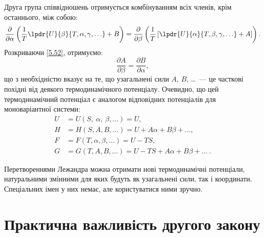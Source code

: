 Друга група співвідношень отримується комбінуванням всіх членів, крім останнього, між собою:
\begin{equation}\label{5.52}
	\dfrac{\partial}{\partial\alpha}\left(\dfrac{1}{T}\lpdr{U}{\beta}{T,\alpha,\gamma,
		\ldots}+B\right)=\dfrac{\partial}{\partial\beta}\left(\dfrac{1}{T}\left[\lpdr{U}{\alpha}{T,\beta,
			\gamma, \ldots}+A\right]\right).
\end{equation}
Розкриваючи \eqref{5.52}, отримуємо:
\begin{equation}\label{5.53}
	\dfrac{\partial A}{\partial \beta}=\dfrac{\partial B}{\partial \alpha},
\end{equation}
що з необхідністю вказує на те, що узагальнені сили $A$, $B$, \ldots\ --- це часткові похідні від деякого термодинамічного потенціалу. Очевидно, що цей термодинамічний потенціал є аналогом відповідних потенціалів для моноваріантної системи:
\begin{align}
	U & = U\left(S,\ \alpha,\ \beta, \ldots\right)=U, \label{5.54}              \\
	H & = H\left(S,A,B,\ldots\right)=U+A\alpha+B\beta+\ldots, \label{5.55}      \\
	F & = F\left(T,\alpha,\beta,\ldots\right)=U-TS, \label{5.56}                \\
	G & = G\left(T,A,B,\ldots\right)=U-TS+A\alpha+B\beta+\ldots\ . \label{5.57}
\end{align}

Перетвореннями Лежандра можна отримати нові термодинамічні потенціали, натуральними змінними для яких будуть як узагальнені сили, так і координати. Спеціальних імен у них немає, але користуватися ними зручно.

\section{Практична важливість другого закону}

